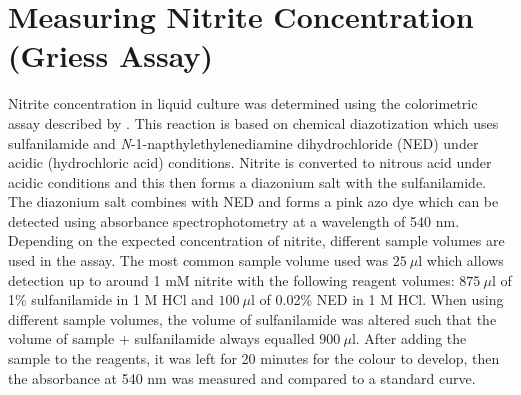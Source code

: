\section{Measuring Nitrite Concentration (Griess Assay)}
Nitrite concentration in liquid culture was determined using the colorimetric assay described by \citet{DonaldNicholas1957}. This reaction is based on chemical diazotization which uses sulfanilamide and \textit{N}-1-napthylethylenediamine dihydrochloride (NED) under acidic (hydrochloric acid) conditions. Nitrite is converted to nitrous acid under acidic conditions and this then forms a diazonium salt with the sulfanilamide. The diazonium salt combines with NED and forms a pink azo dye which can be detected using absorbance spectrophotometry at a wavelength of 540 nm. Depending on the expected concentration of nitrite, different sample volumes are used in the assay. The most common sample volume used was $25~\mu\textrm{l}$ which allows detection up to around 1 mM nitrite with the following reagent volumes: $875~\mu\textrm{l}$ of 1\% sulfanilamide in 1 M HCl and $100~\mu\textrm{l}$ of 0.02\% NED in 1 M HCl. When using different sample volumes, the volume of sulfanilamide was altered such that the volume of sample + sulfanilamide always equalled $900~\mu\textrm{l}$. After adding the sample to the reagents, it was left for 20 minutes for the colour to develop, then the absorbance at 540 nm was measured and compared to a standard curve.

